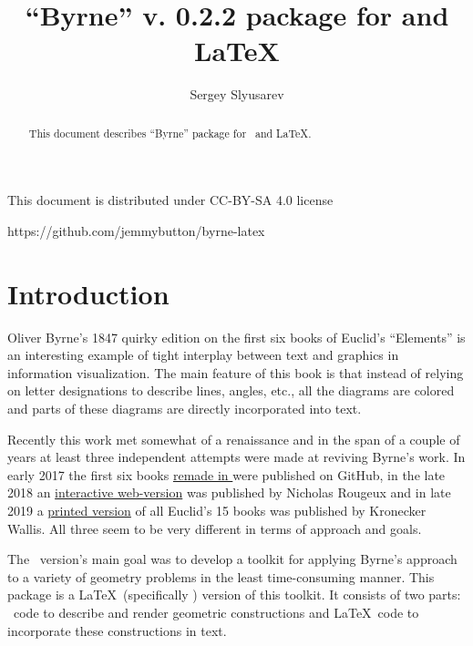 \documentclass{ltxdoc}
\author{Sergey Slyusarev}
\title{``Byrne'' v. 0.2.2 package for \METAPOST and \LaTeX}
\begin{document}
\maketitle

\begin{abstract}
This document describes ``Byrne'' package for \METAPOST\ and \LaTeX.
\end{abstract}

\begin{centering}

This document is distributed under CC-BY-SA 4.0 license 

\ccbysa 

https://github.com/jemmybutton/byrne-latex

\end{centering}

\section{Introduction}
Oliver Byrne's 1847 quirky edition on the first six books of Euclid's ``Elements'' is an interesting example of tight interplay between text and graphics in information visualization. The main feature of this book is that instead of relying on letter designations to describe lines, angles, etc., all the diagrams are colored and parts of these diagrams are directly incorporated into text.

Recently this work met somewhat of a renaissance and in the span of a couple of years at least three independent attempts were made at reviving Byrne's work. In early 2017 the first six books \href{https://github.com/jemmybutton/byrne-euclid/}{remade in \ConTeXt} were published on GitHub, in the late 2018 an \href{https://www.c82.net/euclid/}{interactive web-version} was published by Nicholas Rougeux and in late 2019 a \href{https://www.kroneckerwallis.com/product/euclids-elements-completing-oliver-byrnes-work/}{printed version} of all Euclid's 15 books was published by Kronecker Wallis. All three seem to be very different in terms of approach and goals.

The \ConTeXt\ version's main goal was to develop a toolkit for applying Byrne's approach to a variety of geometry problems in the least time-consuming manner. This package is a \LaTeX\ (specifically \LuaLaTeX) version of this toolkit. It consists of two parts: \METAPOST\ code to describe and render geometric constructions and \LaTeX\ code to incorporate these constructions in text.
\end{document}
